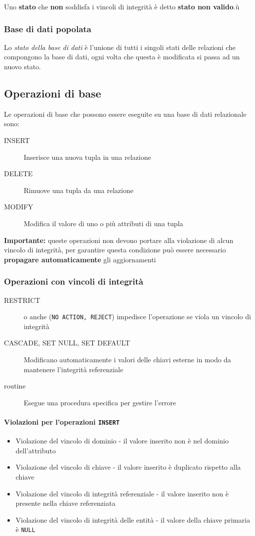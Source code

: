             Uno \textbf{stato} che \textbf{non} soddisfa i vincoli di integrità è detto \textbf{stato non valido}.ù
        \subsubsection{Base di dati popolata}
            Lo \textit{stato della base di dati} è l'unione di tutti i singoli stati delle relazioni che compongono la base di dati, ogni volta che questa è modificata si passa ad un nuovo stato.
    \subsection{Operazioni di base}
        Le operazioni di base che possono essere eseguite su una base di dati relazionale sono:
        \begin{description}
            \item[INSERT] Inserisce una nuova tupla in una relazione 
            \item[DELETE] Rimuove una tupla da una relazione
            \item[MODIFY] Modifica il valore di uno o più attributi di una tupla
        \end{description}
        \textbf{Importante:} queste operazioni non devono portare alla violazione di alcun vincolo di integrità, per garantire questa condizione può essere necessario \textbf{propagare automaticamente} gli aggiornamenti
        \subsubsection{Operazioni con vincoli di integrità}
            \begin{description}
                \item[RESTRICT] o anche (\texttt{NO ACTION, REJECT}) impedisce l'operazione se viola un vincolo di integrità
                \item[CASCADE, SET NULL, SET DEFAULT] Modificano automaticamente i valori delle chiavi esterne in modo da mantenere l'integrità referenziale
                \item[routine] Esegue una procedura specifica per gestire l'errore
            \end{description}
            \paragraph{Violazioni per l'operazioni \texttt{INSERT}}
                \begin{itemize}
                    \item Violazione del vincolo di dominio - il valore inserito non è nel dominio dell'attributo
                    \item Violazione del vincolo di chiave - il valore inserito è duplicato rispetto alla chiave
                    \item Violazione del vincolo di integrità referenziale - il valore inserito non è presente nella chiave referenziata
                    \item Violazione del vincolo di integrità delle entità - il valore della chiave primaria è \texttt{NULL}
                \end{itemize}
